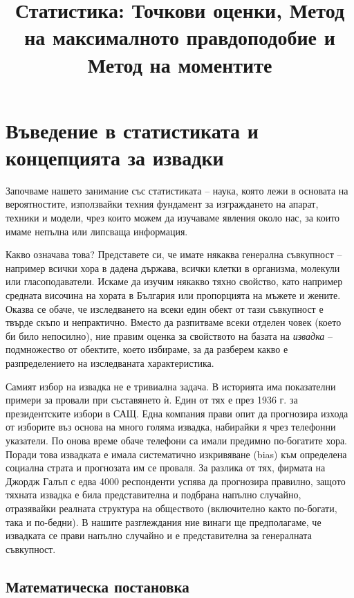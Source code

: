 \documentclass{article}
\begin{document}
\title{Статистика: Точкови оценки, Метод на максималното правдоподобие и Метод на моментите}
\author{}
\date{}
\maketitle

\section{Въведение в статистиката и концепцията за извадки}

Започваме нашето занимание със статистиката -- наука, която лежи в основата на вероятностите, използвайки техния фундамент за изграждането на апарат, техники и модели, чрез които можем да изучаваме явления около нас, за които имаме непълна или липсваща информация. 

Какво означава това? Представете си, че имате някаква генерална съвкупност -- например всички хора в дадена държава, всички клетки в организма, молекули или гласоподаватели. Искаме да изучим някакво тяхно свойство, като например средната височина на хората в България или пропорцията на мъжете и жените. Оказва се обаче, че изследването на всеки един обект от тази съвкупност е твърде скъпо и непрактично. Вместо да разпитваме всеки отделен човек (което би било непосилно), ние правим оценка за свойството на базата на \emph{извадка} -- подмножество от обектите, което избираме, за да разберем какво е разпределението на изследваната характеристика. 

Самият избор на извадка не е тривиална задача. В историята има показателни примери за провали при съставянето ѝ. Един от тях е през 1936 г. за президентските избори в САЩ. Една компания прави опит да прогнозира изхода от изборите въз основа на много голяма извадка, набирайки я чрез телефонни указатели. По онова време обаче телефони са имали предимно по-богатите хора. Поради това извадката е имала систематично изкривяване (bias) към определена социална страта и прогнозата им се проваля. За разлика от тях, фирмата на Джордж Галъп с едва 4000 респонденти успява да прогнозира правилно, защото тяхната извадка е била представителна и подбрана напълно случайно, отразявайки реалната структура на обществото (включително както по-богати, така и по-бедни). В нашите разглеждания ние винаги ще предполагаме, че извадката се прави напълно случайно и е представителна за генералната съвкупност.

\subsection{Математическа постановка}
\end{document}
